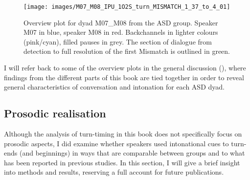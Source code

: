 	
	
	\begin{figure}
	
	{\centering \texttt{[image: images/M07\_M08\_IPU\_1O2S\_turn\_MISMATCH\_1\_37\_to\_4\_01]} 
		
	}
	
	\caption{Overview plot for dyad M07\_M08 from the ASD group. Speaker M07 in blue, speaker M08 in red. Backchannels in lighter colours (pink/cyan), filled pauses in grey. The section of dialogue from detection to full resolution of the first Mismatch is outlined in green.}\label{fig:TurnationM07M08}
	\end{figure}
	
	I will refer back to some of the overview plots in the general discussion (), where findings from the different parts of this book are tied together in order to reveal general characteristics of conversation and intonation for each ASD dyad.


\subsection{Prosodic realisation}\label{turntaking_results_intonation}

Although the analysis of turn-timing in this book does not specifically focus on prosodic aspects, I did examine whether speakers used intonational cues to turn-ends (and beginnings) in ways that are comparable between groups and to what has been reported in previous studies. In this section, I will give a brief insight into methods and results, reserving a full account for future publications.


